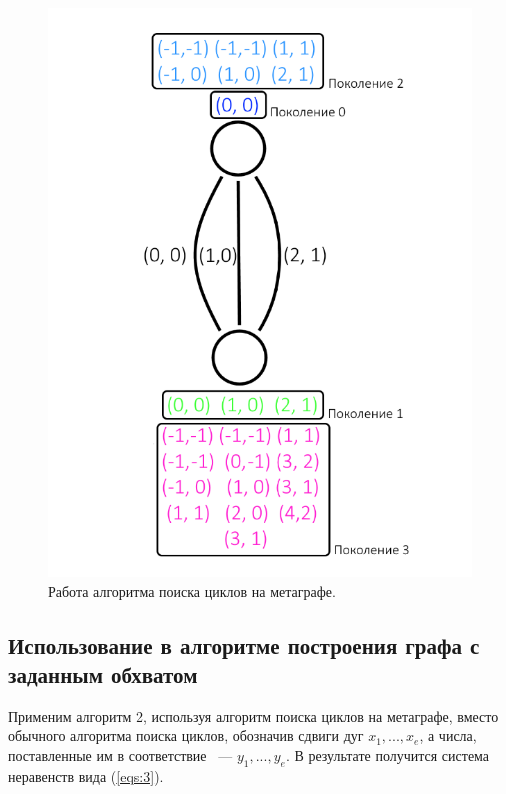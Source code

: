 \documentclass[14pt]{mmcs-article}
\begin{document}
\begin{figure}[H]
  \centering
  \includegraphics[scale=0.5]{Fig_9.png}
  \caption{ Работа алгоритма поиска циклов на метаграфе. }
  \label{metagraph:2}
\end{figure}

\subsection{Использование в алгоритме построения графа с заданным обхватом}

Применим алгоритм 2, используя алгоритм поиска циклов на метаграфе, вместо обычного алгоритма поиска циклов, обозначив сдвиги дуг $x_1, ..., x_e$, а числа, поставленные им в соответствие ~--- $y_1, ..., y_e$. В результате получится система неравенств вида (\ref{eqs:3}).
\end{document}
